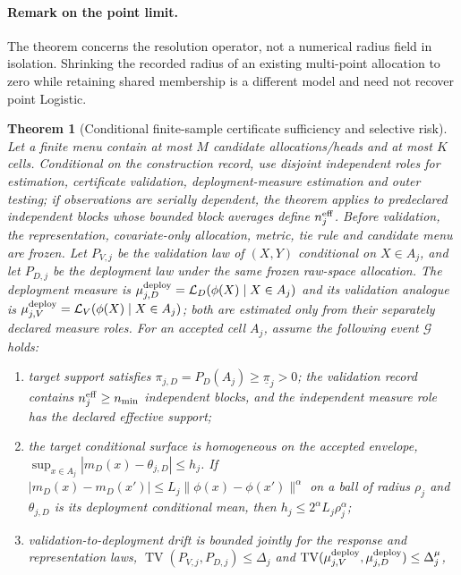 \documentclass[11pt,a4paper]{article}
\numberwithin{equation}{section}
\newtheorem{theorem}{Theorem}[section]
\theoremstyle{definition}\newtheorem{definition}[theorem]{Definition}
\theoremstyle{remark}\newtheorem{remark}[theorem]{Remark}
\begin{document}
\paragraph{Remark on the point limit.}
The theorem concerns the resolution operator, not a numerical radius field in
isolation. Shrinking the recorded radius of an existing multi-point allocation
to zero while retaining shared membership is a different model and need not
recover point Logistic.

\begin{theorem}[Conditional finite-sample certificate sufficiency and selective risk]
\label{thm:certificate_sufficiency}
Let a finite menu contain at most $M$ candidate allocations/heads and at most
$K$ cells. Conditional on the construction record, use disjoint independent
roles for estimation, certificate validation, deployment-measure estimation and
outer testing; if observations are serially dependent, the theorem applies to
predeclared independent blocks whose bounded block averages define
$n^{\rm eff}_j$. Before validation, the representation, covariate-only
allocation, metric, tie rule and candidate menu are frozen. Let
$P_{V,j}$ be the validation law of $(X,Y)$ conditional on $X\in A_j$, and let
$P_{D,j}$ be the deployment law under the same frozen raw-space allocation.
The deployment measure is
$\mu^{\rm deploy}_{j,D}=\mathcal L_D(\phi(X)\mid X\in A_j)$ and its validation
analogue is $\mu^{\rm deploy}_{j,V}=\mathcal L_V(\phi(X)\mid X\in A_j)$; both
are estimated only from their separately declared measure roles. For an accepted cell
$A_j$, assume the following event $\mathcal G$ holds:
\begin{enumerate}[label=(A\arabic*)]
\item target support satisfies $\pi_{j,D}=P_D(A_j)\geq\underline\pi_j>0$;
 the validation record contains $n^{\rm eff}_j\geq n_{\min}$ independent
 blocks, and the independent measure role has the declared effective support;
\item the target conditional surface is homogeneous on the accepted envelope,
$\sup_{x\in A_j}|m_D(x)-\theta_{j,D}|\leq h_j$. If
$|m_D(x)-m_D(x')|\leq L_j\|\phi(x)-\phi(x')\|^\alpha$ on a ball of
radius $\rho_j$ and $\theta_{j,D}$ is its deployment conditional mean, then
$h_j\leq 2^\alpha L_j\rho_j^\alpha$;
\item validation-to-deployment drift is bounded jointly for the response and
representation laws,
$\operatorname{TV}(P_{V,j},P_{D,j})\leq\Delta_j$ and
$\operatorname{TV}(\mu_{j,V}^{\rm deploy},\mu_{j,D}^{\rm deploy})\leq\Delta^{\mu}_j$,

\end{enumerate}
\end{theorem}
\end{document}

